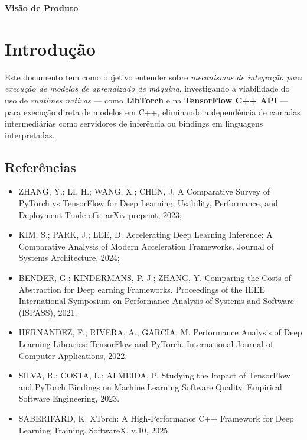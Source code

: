 


%

\begin{center}
    \textbf{\Huge Visão de Produto}
\end{center}

\section{Introdução}

Este documento tem como objetivo entender sobre \textit{mecanismos de integração
para execução de modelos de aprendizado de máquina}, investigando a viabilidade do uso
de \textit{runtimes nativas} — como  \textbf{LibTorch} e na \textbf{TensorFlow C++ API} —
para execução direta de modelos em C++, eliminando a dependência de camadas intermediárias
como servidores de inferência ou bindings em linguagens interpretadas.


\subsection{Referências}

\begin{itemize}
   \item ZHANG, Y.; LI, H.; WANG, X.; CHEN, J. A Comparative Survey of PyTorch vs TensorFlow for Deep Learning: Usability, Performance, and Deployment Trade-offs. arXiv preprint, 2023;
   \item KIM, S.; PARK, J.; LEE, D. Accelerating Deep Learning Inference: A Comparative Analysis of Modern Acceleration Frameworks. Journal of Systems Architecture, 2024;
   \item BENDER, G.; KINDERMANS, P.-J.; ZHANG, Y. Comparing the Costs of Abstraction for Deep earning Frameworks. Proceedings of the IEEE International Symposium on Performance Analysis of Systems and Software (ISPASS), 2021.
   \item HERNANDEZ, F.; RIVERA, A.; GARCIA, M. Performance Analysis of Deep Learning Libraries: TensorFlow and PyTorch. International Journal of Computer Applications, 2022.
   \item SILVA, R.; COSTA, L.; ALMEIDA, P. Studying the Impact of TensorFlow and PyTorch Bindings on Machine Learning Software Quality. Empirical Software Engineering, 2023.
   \item SABERIFARD, K. XTorch: A High-Performance C++ Framework for Deep Learning Training. SoftwareX, v.10, 2025.
\end{itemize}

